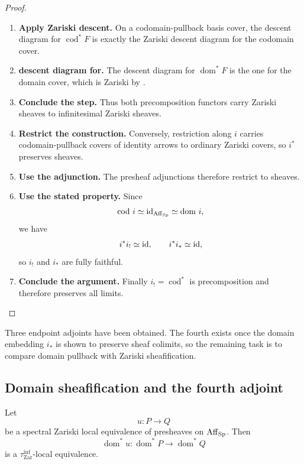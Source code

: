 \begin{proof}
\leavevmode
\begin{enumerate}[label=\textup{(\arabic*)}]
    \item \textbf{Apply Zariski descent.}
    On a codomain-pullback basis cover, the descent diagram for \(\operatorname{cod}^*F\) is exactly the
    Zariski descent diagram for the codomain cover.

    \item \textbf{descent diagram for.}
    The descent diagram for \(\operatorname{dom}^*F\) is the one for the domain cover, which is Zariski by
    .

    \item \textbf{Conclude the step.}
    Thus both precomposition functors carry Zariski sheaves to infinitesimal Zariski sheaves.

    \item \textbf{Restrict the construction.}
    Conversely, restriction along \(i\) carries codomain-pullback covers of identity
    arrows to ordinary Zariski covers, so \(i^*\) preserves sheaves.

    \item \textbf{Use the adjunction.}
    The presheaf adjunctions therefore restrict to sheaves.

    \item \textbf{Use the stated property.}
    Since
    \[
        \operatorname{cod}\,i\simeq\operatorname{id}_{\operatorname{Aff}_{\operatorname{Sp}}}
        \simeq
        \operatorname{dom}\,i,
    \]
    we have
    \[
        i^*i_!\simeq\operatorname{id},
        \qquad
        i^*i_*\simeq\operatorname{id},
    \]
    so \(i_!\) and \(i_*\) are fully faithful.

    \item \textbf{Conclude the argument.}
    Finally \(i_!=\operatorname{cod}^*\) is precomposition and therefore preserves all limits.
\end{enumerate}
\end{proof}
Three endpoint adjoints have been obtained. The fourth exists once the domain
embedding \(i_*\) is shown to preserve sheaf colimits, so the remaining task is
to compare domain pullback with Zariski sheafification.

\subsection{Domain sheafification and the fourth adjoint}

\begin{lemma}
\label{lem:source-pullback-local-equivalences}
Let
\[
    u:P\longrightarrow Q
\]
be a spectral Zariski local equivalence of presheaves on \(\operatorname{Aff}_{\operatorname{Sp}}\).
Then
\[
    \operatorname{dom}^*u:\operatorname{dom}^*P\longrightarrow \operatorname{dom}^*Q
\]
is a \(\tau^{\inf}_{\mathrm{Zar}}\)-local equivalence.
\end{lemma}

